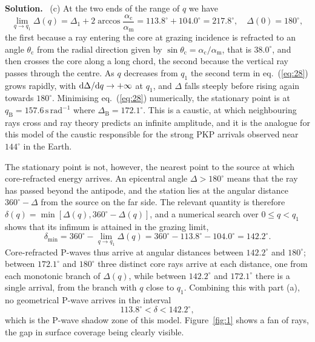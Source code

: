 \documentclass[a4paper,12pt]{paper}
\newenvironment{solution}{\par\noindent\textbf{Solution.}\ }{\par\medskip}
\begin{document}
\begin{solution}
(c) At the two ends of the range of $q$ we have
\begin{equation}
\lim_{q\to q_{1}}\Delta(q)=\Delta_{1}+2\arccos\frac{\alpha_{\mathrm{c}}}{\alpha_{\mathrm{m}}}
=113.8^{\circ}+104.0^{\circ}=217.8^{\circ},\quad \Delta(0)=180^{\circ},
\label{eq:30}
\end{equation}
the first because a ray entering the core at grazing incidence is refracted to an angle
$\theta_{\mathrm{c}}$ from the radial direction given by
$\sin\theta_{\mathrm{c}}=\alpha_{\mathrm{c}}/\alpha_{\mathrm{m}}$, that is $38.0^{\circ}$, and
then crosses the core along a long chord, the second because the vertical
ray passes through the centre. As $q$ decreases from $q_{1}$ the second term in
eq.~(\ref{eq:28}) grows rapidly, with $\mathrm{d}\Delta/\mathrm{d} q\to+\infty$ at $q_{1}$, and $\Delta$
falls steeply before rising again towards $180^{\circ}$. Minimising eq.~(\ref{eq:28})
numerically, the stationary point is at $q_{\mathrm{B}}=157.6\,\mathrm{s\,rad^{-1}}$ where
$\Delta_{\mathrm{B}}=172.1^{\circ}$. This is a caustic, at which neighbouring rays cross and
ray theory predicts an infinite amplitude, and it is the analogue for this model of the
caustic responsible for the strong PKP arrivals observed near $144^{\circ}$ in the Earth.

The stationary point is not, however, the nearest point to the source at which core-refracted
energy arrives. An epicentral angle $\Delta>180^{\circ}$ means that the ray has passed beyond
the antipode, and the station lies at the angular distance $360^{\circ}-\Delta$ from the source
on the far side. The relevant quantity is therefore $\delta(q)=\min[\Delta(q),360^{\circ}-\Delta(q)]$,
and a numerical search over $0\le q<q_{1}$ shows that its infimum is attained in the grazing
limit,
\begin{equation}
\delta_{\min}=360^{\circ}-\lim_{q\to q_{1}}\Delta(q)=360^{\circ}-113.8^{\circ}-104.0^{\circ}=142.2^{\circ}.
\label{eq:31}
\end{equation}
Core-refracted P-waves thus arrive at angular distances between $142.2^{\circ}$ and
$180^{\circ}$; between $172.1^{\circ}$ and $180^{\circ}$ three distinct core rays arrive at each
distance, one from each monotonic branch of $\Delta(q)$, while between $142.2^{\circ}$ and
$172.1^{\circ}$ there is a single arrival, from the branch with $q$ close to $q_{1}$. Combining
this with part (a), no geometrical P-wave arrives in the interval
\begin{equation}
113.8^{\circ}<\delta<142.2^{\circ},
\label{eq:32}
\end{equation}
which is the P-wave shadow zone of this model. Figure~\ref{fig:1} shows a fan of rays, the
gap in surface coverage being clearly visible.


\end{solution}
\end{document}
